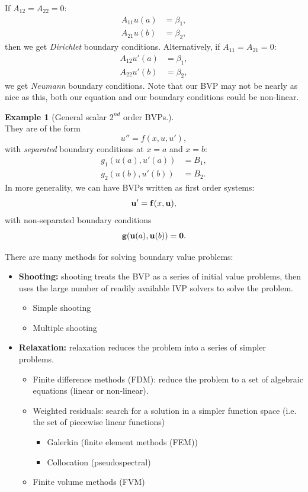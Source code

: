 \documentclass[12pt, a4paper]{article}
\theoremstyle{definition}
\newtheorem{example}[thm]{Example}
\theoremstyle{remark}
\numberwithin{equation}{section}
\begin{document}
If $A_{12}=A_{22}=0$:
\begin{align*}
A_{11}u(a)&=\beta_1,\\
A_{21}u(b)&=\beta_2,
\end{align*}
then we get \emph{Dirichlet} boundary conditions.
 Alternatively, if $A_{11}=A_{21}=0$:
\begin{align*}
A_{12}u'(a)&=\beta_1,\\
A_{22}u'(b)&=\beta_2,
\end{align*}
we get \emph{Neumann} boundary conditions.
Note that our BVP may not be nearly as nice as this, both our equation and our boundary conditions could be non-linear.

\newpage
\begin{example}[General scalar $2^{nd}$ order BVPs.] \ \\
They are of the form 
\begin{equation*}
u'' = f(x,u,u'),
\end{equation*}
with \emph{separated} boundary conditions at $x=a$ and $x=b$:
\begin{align*}
g_1(u(a), u'(a))&=B_1,\\
g_2(u(b), u'(b))&=B_2.
\end{align*}
In more generality, we can have BVPs written as first order systems:
\begin{equation*}
{\bf u}' = {\bf f}(x,{\bf u}),
\end{equation*}
with non-separated boundary conditions
\begin{equation*}
{\bf g}({\bf u}(a), {\bf u}(b)) = {\bf 0}.
\end{equation*}
\end{example}


\newpage

There are many methods for solving boundary value problems:
\begin{itemize}
\item \textbf{Shooting:} shooting treats the BVP as a series of initial value problems, then uses the large number of readily available IVP solvers to solve the problem.
\begin{itemize}
\item Simple shooting
\item Multiple shooting
\end{itemize}
\item \textbf{Relaxation:} relaxation reduces the problem into a series of simpler problems.
\begin{itemize}
\item Finite difference methods (FDM): reduce the problem to a set of algebraic equations (linear or non-linear).
\item Weighted residuals: search for a solution in a simpler function space (i.e. the set of piecewise linear functions)
\begin{itemize}
\item Galerkin (finite element methods (FEM))
\item Collocation (pseudospectral)
\end{itemize}
\item Finite volume methods (FVM)
\end{itemize}
\end{itemize}
\end{document}

